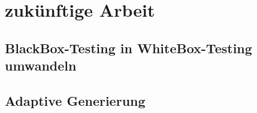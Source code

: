 \chapter{zukünftige Arbeit}

\section{BlackBox-Testing in WhiteBox-Testing umwandeln}

\section{Adaptive Generierung}